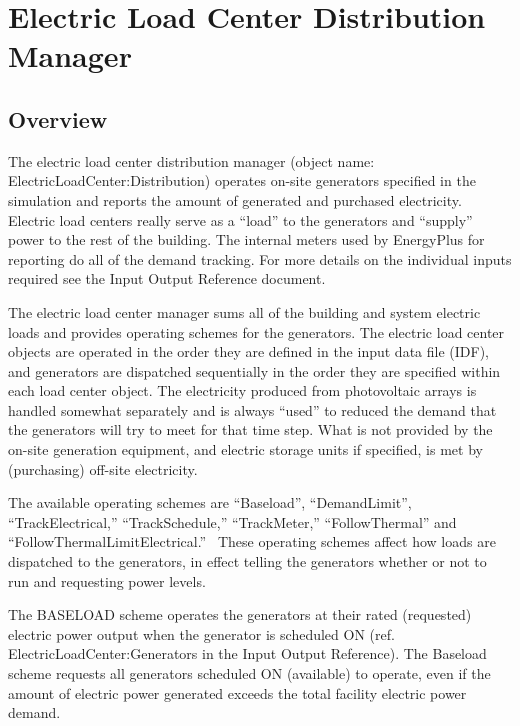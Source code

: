 \section{Electric Load Center Distribution Manager}\label{electric-load-center-distribution-manager}

\subsection{Overview}\label{overview-016}

The electric load center distribution manager (object name: ElectricLoadCenter:Distribution) operates on-site generators specified in the simulation and reports the amount of generated and purchased electricity. Electric load centers really serve as a ``load'' to the generators and ``supply'' power to the rest of the building. The internal meters used by EnergyPlus for reporting do all of the demand tracking. For more details on the individual inputs required see the Input Output Reference document.

The electric load center manager sums all of the building and system electric loads and provides operating schemes for the generators. The electric load center objects are operated in the order they are defined in the input data file (IDF), and generators are dispatched sequentially in the order they are specified within each load center object. The electricity produced from photovoltaic arrays is handled somewhat separately and is always ``used'' to reduced the demand that the generators will try to meet for that time step. What is not provided by the on-site generation equipment, and electric storage units if specified, is met by (purchasing) off-site electricity.

The available operating schemes are ``Baseload'', ``DemandLimit'', ``TrackElectrical,'' ``TrackSchedule,'' ``TrackMeter,'' ``FollowThermal'' and ``FollowThermalLimitElectrical.''~ These operating schemes affect how loads are dispatched to the generators, in effect telling the generators whether or not to run and requesting power levels.

The BASELOAD scheme operates the generators at their rated (requested) electric power output when the generator is scheduled ON (ref. ElectricLoadCenter:Generators in the Input Output Reference). The Baseload scheme requests all generators scheduled ON (available) to operate, even if the amount of electric power generated exceeds the total facility electric power demand.

